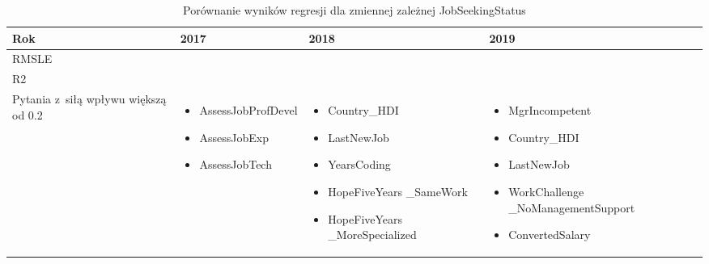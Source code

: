 \noindent\begin{minipage}{\textwidth}
             \begin{table}[H]
                 \raggedright\caption{Porównanie wyników regresji dla zmiennej zależnej JobSeekingStatus\label{tabela:JobSeekingStatusRegression}}
                 \begin{center}
                     \begin{tabular}{|P{.1\textwidth}|P{.26\textwidth}|P{.26\textwidth}|P{.26\textwidth}|}

                         \hline
                         Rok   & 2017             & 2018             & 2019             \\
                         \hline
                         RMSLE &  &  &  \\
                         \hline
                         R2    &  &    &    \\
                         \hline
                         Pytania z~siłą wpływu większą od 0.2 &
                         \begin{itemize}
                             \item AssessJobProfDevel
                             \item AssessJobExp
                             \item AssessJobTech
                         \end{itemize} &
                         \begin{itemize}
                             \item Country\_HDI
                             \item LastNewJob
                             \item YearsCoding
                             \item HopeFiveYears \_SameWork
                             \item HopeFiveYears \_MoreSpecialized
                         \end{itemize} &
                         \begin{itemize}
                             \item MgrIncompetent
                             \item Country\_HDI
                             \item LastNewJob
                             \item WorkChallenge \_NoManagementSupport
                             \item ConvertedSalary
                         \end{itemize} \\
                         \hline
                     \end{tabular}
                 \end{center}
                 \raggedright\source{\ownwork}
                 \vspace{0.75cm}
             \end{table}
\end{minipage}

